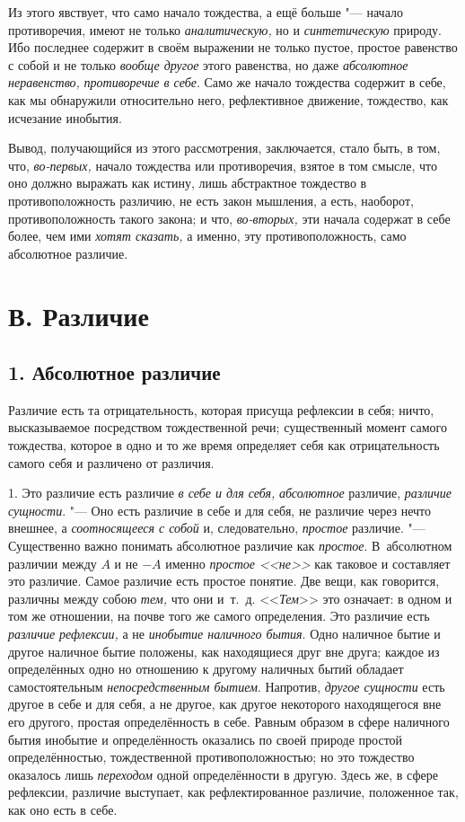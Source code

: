 Из этого явствует, что само начало тождества, а ещё больше "--- начало
противоречия, имеют не только {\em аналитическую,} но и
{\em синтетическую} природу. Ибо последнее содержит в
своём выражении не только пустое, простое равенство с собой и не только
{\em вообще другое} этого равенства, но даже
{\em абсолютное неравенство,}
{\em противоречие в себе}. Само же начало тождества
содержит в себе, как мы обнаружили относительно него, рефлективное
движение, тождество, как исчезание инобытия.

Вывод, получающийся из этого рассмотрения, заключается, стало быть, в том,
что, {\em во-первых,} начало тождества или
противоречия, взятое в том смысле, что оно должно выражать как истину, лишь
абстрактное тождество в противоположность различию, не есть закон мышления,
а есть, наоборот, противоположность такого закона; и что,
{\em во-вторых,} эти начала содержат в себе более, чем
ими {\em хотят сказать,} а именно, эту
противоположность, само абсолютное различие.

\section[В. Различие]{В. Различие}
\subsection[1. Абсолютное различие]{1. Абсолютное различие}
Различие есть та отрицательность, которая
присуща рефлексии в себя; ничто, высказываемое посредством тождественной
речи; существенный момент самого тождества, которое в одно и то же время
определяет себя как отрицательность самого себя и различено от различия.

1. Это различие есть различие {\em в себе и для себя,}
{\em абсолютное} различие,
{\em различие сущности}. "--- Оно есть различие в себе и
для себя, не различие через нечто внешнее, а
{\em соотносящееся с собой} и, следовательно,
{\em простое} различие. "--- Существенно важно понимать
абсолютное различие как {\em простое}. В~абсолютном
различии между $A$ и не $-A$ именно
{\em простое <<не>>} как таковое и составляет это
различие. Самое различие есть простое понятие. Две вещи, как говорится,
различны между собою {\em тем,} что они и~т.~д.
<<{\em Тем}>> это означает: в одном и том же отношении,
на почве того же самого определения. Это различие есть
{\em различие рефлексии,} а не
{\em инобытие наличного бытия}. Одно наличное бытие и
другое наличное бытие положены, как находящиеся друг вне друга; каждое из
определённых одно но отношению к другому наличных бытий обладает
самостоятельным {\em непосредственным бытием}.
Напротив, {\em другое сущности} есть другое в себе и
для себя, а не другое, как другое некоторого находящегося вне его другого,
простая определённость в себе. Равным образом в сфере наличного бытия
инобытие и определённость оказались по своей природе простой
определённостью, тождественной противоположностью; но это тождество
оказалось лишь {\em переходом} одной определённости в
другую. Здесь же, в сфере рефлексии, различие выступает, как
рефлектированное различие, положенное так, как оно есть в себе.

